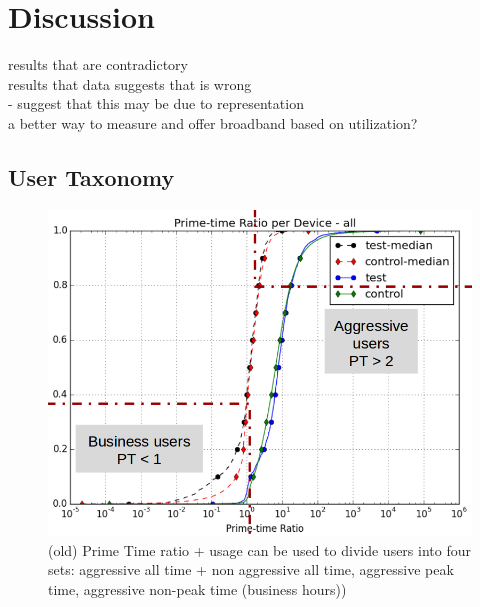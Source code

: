 \section{Discussion}
\label{sec:discussion}
results that are contradictory\\
results that data suggests that is wrong\\ 
- suggest that this may be due to representation\\
a better way to measure and offer broadband based on utilization?

\subsection{User Taxonomy}
\label{subsec:taxonomy}



\begin{figure}[t!]
\begin{minipage}{1\linewidth}
\centering
\includegraphics[width=\linewidth]{figures/cdf-prime-time-ratio[replace].png}
\caption{(old) Prime Time ratio + usage can be used to divide users into four sets: aggressive all time + non aggressive all time, aggressive peak time, aggressive non-peak time (business hours))}
\label{fig:CDF-prime-time-ratio}
\end{minipage}
\end{figure}




